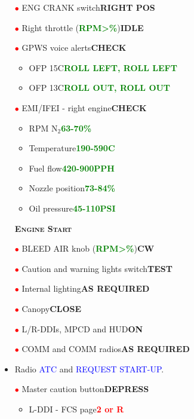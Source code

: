 \documentclass[a4paper,12pt,dvipsnames]{letter}
\newcommand{\radio}[1]{\textcolor{blue}{#1}}
\newcommand{\button}[1]{\textbf{#1}}
\newcommand{\degC}{\textdegree{}C}
\newcommand{\ok}[1]{\textcolor{Green}{\textbf{#1}}}
\newcommand{\warn}[1]{\textcolor{Red}{\textbf{#1}}}
\newcommand{\myHead}[1]{{\LARGE\textsc{\textbf{#1}}}}
\newcommand{\ri}{\textcolor{red}{$\bullet$\;}}
\begin{document}
{\begin{itemize}
\begin{itemize}
 \end{itemize}
 \item[\ri] ENG CRANK switch\dotfill\button{RIGHT POS}
 \item[\ri] Right throttle (\ok{RPM\;>\%})\dotfill\button{IDLE}
 \item[\ri] GPWS voice alerts\dotfill\button{CHECK}
 \begin{itemize}
  \item OFP 15C\dotfill\ok{ROLL LEFT, ROLL LEFT}
  \item OFP 13C\dotfill\ok{ROLL OUT, ROLL OUT}
 \end{itemize}
 \item[\ri]EMI/IFEI - right engine\dotfill\button{CHECK}
 \begin{itemize}
  \item RPM N$_2$\dotfill\ok{63-70\%}
  \item Temperature\dotfill\ok{190-590\degC}
  \item Fuel flow\dotfill\ok{420-900\;PPH}
  \item Nozzle position\dotfill\ok{73-84\%}
  \item Oil pressure\dotfill\ok{45-110\;PSI}
 \end{itemize}
\end{itemize}
\newpage
\begin{itemize}
 \item[] \myHead{Engine Start} 
 \item[\ri] BLEED AIR knob (\ok{RPM\;>\%})\dotfill\button{CW\textdegree}
 \item[\ri] Caution and warning lights switch\dotfill\button{TEST}
 \item[\ri] Internal lighting\dotfill\button{AS REQUIRED}
 \item[\ri] Canopy\dotfill\button{CLOSE}
 \item[\ri] L/R-DDIs, MPCD and HUD\dotfill\button{ON}
 \item[\ri] COMM and COMM radios\dotfill\button{AS REQUIRED}
 \item Radio \radio{ATC} and \radio{REQUEST START-UP}.
 \item[\ri] Master caution button\dotfill\button{DEPRESS}
 \begin{itemize}
  \item L-DDI - FCS page\dotfill\warn{2 or R}

\end{itemize}
\end{itemize}}
\end{document}
